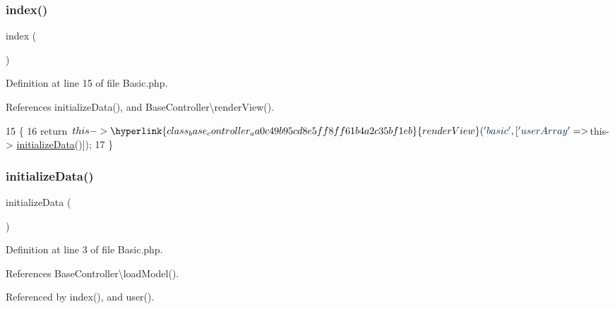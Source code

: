 \subsubsection{\texorpdfstring{index()}{index()}}
{\footnotesize\ttfamily index (\begin{DoxyParamCaption}{ }\end{DoxyParamCaption})}



Definition at line 15 of file Basic.\+php.



References initialize\+Data(), and Base\+Controller\textbackslash{}render\+View().


\begin{DoxyCode}
15                             \{
16         \textcolor{keywordflow}{return} $this->\hyperlink{class_base_controller_aa0c49b95cd8e5ff8ff61b4a2c35bf1eb}{renderView}(\textcolor{stringliteral}{'basic'}, [\textcolor{stringliteral}{'userArray'} => $this->
      \hyperlink{class_basic_a8e1839f9e7441ef2a15a3f5ca8fa6f8e}{initializeData}()]);
17     \}
\end{DoxyCode}
\hypertarget{class_basic_a8e1839f9e7441ef2a15a3f5ca8fa6f8e}{}\label{class_basic_a8e1839f9e7441ef2a15a3f5ca8fa6f8e} 
\subsubsection{\texorpdfstring{initialize\+Data()}{initializeData()}}
{\footnotesize\ttfamily initialize\+Data (\begin{DoxyParamCaption}{ }\end{DoxyParamCaption})}



Definition at line 3 of file Basic.\+php.



References Base\+Controller\textbackslash{}load\+Model().



Referenced by index(), and user().


